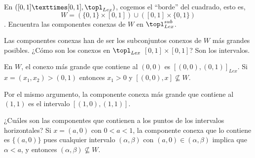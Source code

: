 \begin{problem} En $([0,1]×[0,1], \topl_{Lex})$, cogemos el ``borde'' del cuadrado, esto es, \[W = \left(\{0,1\} × [0,1]\right) ∪ \left([0,1] × \{0,1\}\right) \]. Encuentra las componentes conexas de $W$ en $\topl_{Lex}^{sub}$.
\solution

Las componentes conexas han de ser los subconjuntos conexos de $W$ más grandes posibles. ¿Cómo son los conexos en $\topl_{Lex}$ $[0,1]×[0,1]$? Son los intervalos.

En $W$, el conexo más grande que contiene al $(0,0)$ es $[(0,0), (0,1)]_{Lex}$. Si $x = (x_1, x_2) > (0,1)$ entonces $x_1 > 0$ y $[(0,0), x] \nsubseteq W$.

Por el mismo argumento, la componente conexa más grande que contiene al $(1,1)$ es el intervalo $[(1,0), (1,1)]$.

¿Cuáles son las componentes que contienen a los puntos de los intervalos horizontales? Si $x = (a,0)$ con $0<a<1$, la componente conexa que lo contiene es $\{(a,0)\}$ pues cualquier intervalo $(α,β)$ con $(a,0) ∈ (α,β)$ implica que $α < a$, y entonces $(α,β) \nsubseteq W$.
\end{problem}